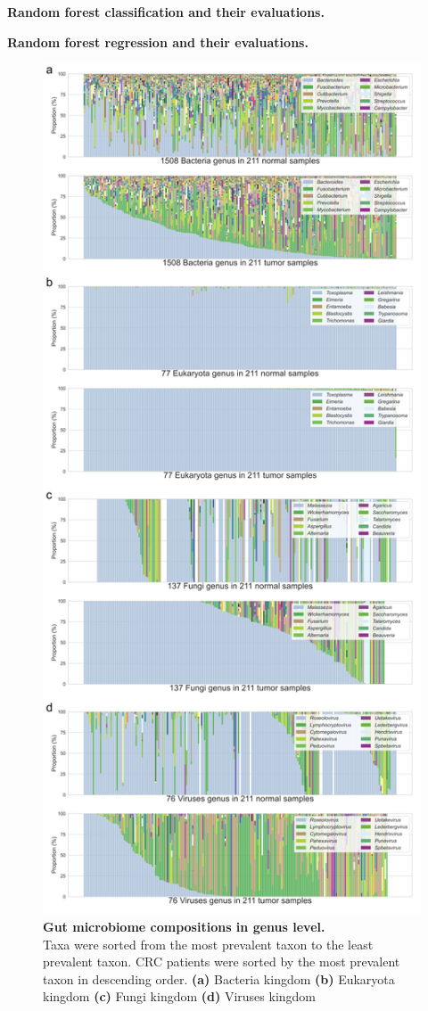 \documentclass[11pt, a4paper, onecolumn, oneside]{report}
\begin{document}
            \begin{table}
                \centering
                \caption[Random forest classification and their evaluations]{\textbf{Random forest classification and their evaluations.}}
                
                \label{tab:CRC-classification}

            \end{table}
            \clearpage

            \begin{table}[p]
                \centering
                \caption[Random forest regression and their evaluations]{\textbf{Random forest regression and their evaluations.}}
                
                \label{tab:CRC-regression}
            \end{table}
            \clearpage

            \begin{figure}[p]
                \centering
                \includegraphics[width=0.6 \linewidth]{Figures/CRC/Figure_01.png}
                \caption[Gut microbiome compositions in genus level]{\textbf{Gut microbiome compositions in genus level.}\\
                    Taxa were sorted from the most prevalent taxon to the least prevalent taxon. CRC patients were sorted by the most prevalent taxon in descending order. \textbf{(a)} Bacteria kingdom \textbf{(b)} Eukaryota kingdom \textbf{(c)} Fungi kingdom \textbf{(d)} Viruses kingdom}
                \label{fig:CRC-composition}
            \end{figure}
            \clearpage
\end{document}
